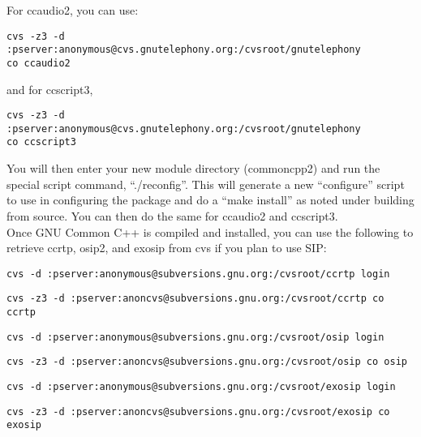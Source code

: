 \documentclass[a4paper,12pt]{article}
\begin{document}
For ccaudio2, you can use: \\

\begin{verbatim}
cvs -z3 -d :pserver:anonymous@cvs.gnutelephony.org:/cvsroot/gnutelephony 
co ccaudio2
\end{verbatim}

and for ccscript3, \\

\begin{verbatim}
cvs -z3 -d :pserver:anonymous@cvs.gnutelephony.org:/cvsroot/gnutelephony 
co ccscript3 
\end{verbatim}

You will then enter your new module directory (commoncpp2) and run the   
special script command, ``./reconfig''.  This will generate a new       
``configure'' script to use in configuring the package and do a ``make
install'' as noted under building from source.  You can then do the
same for ccaudio2 and ccscript3.  \\

Once GNU Common C++ is compiled and installed, you can use the following
to retrieve ccrtp, osip2, and exosip from cvs if you plan to use SIP: \\

\begin{verbatim}
cvs -d :pserver:anonymous@subversions.gnu.org:/cvsroot/ccrtp login
\end{verbatim}

\begin{verbatim}
cvs -z3 -d :pserver:anoncvs@subversions.gnu.org:/cvsroot/ccrtp co ccrtp
\end{verbatim}

\begin{verbatim}
cvs -d :pserver:anonymous@subversions.gnu.org:/cvsroot/osip login
\end{verbatim}

\begin{verbatim}
cvs -z3 -d :pserver:anoncvs@subversions.gnu.org:/cvsroot/osip co osip
\end{verbatim}

\begin{verbatim}
cvs -d :pserver:anonymous@subversions.gnu.org:/cvsroot/exosip login
\end{verbatim}

\begin{verbatim}
cvs -z3 -d :pserver:anoncvs@subversions.gnu.org:/cvsroot/exosip co exosip  
\end{verbatim}
\end{document}
